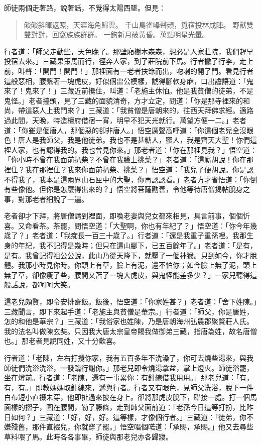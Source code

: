 師徒兩個走著路，說著話，不覺得太陽西墜。但見：
\begin{quote}
燄燄斜暉返照，天涯海角歸雲。
千山鳥雀噪聲頻，覓宿投林成陣。
野獸雙雙對對，回窩族族群群。
一鉤新月破黃昏。萬點明星光暈。
\end{quote}

行者道：「師父走動些，天色晚了。那壁廂樹木森森，想必是人家莊院，我們趕早投宿去來。」三藏果策馬而行，徑奔人家，到了莊院前下馬。行者撇了行李，走上前，叫聲：「開門！開門！」那裡面有一老者扶筇而出，唿喇的開了門。看見行者這般惡相，腰繫著一塊虎皮，好似個雷公模樣，諕得腳軟身麻，口出譫語道：「鬼來了！鬼來了！」三藏近前攙住，叫道：「老施主休怕。他是我貧僧的徒弟，不是鬼怪。」老者擡頭，見了三藏的面貌清奇，方才立定，問道：「你是那寺裡來的和尚，帶這惡人上我門來？」三藏道：「我貧僧是唐朝來的，往西天拜佛求經。適路過此間，天晚，特造檀府借宿一宵，明早不犯天光就行。萬望方便一二。」老者道：「你雖是個唐人，那個惡的卻非唐人。」悟空厲聲高呼道：「你這個老兒全沒眼色！唐人是我師父，我是他徒弟。我也不是甚糖人，蜜人，我是齊天大聖！你們這裡人家，也有認得我的。我也曾見你來。」那老者道：「你在那裡見我？」悟空道：「你小時不曾在我面前扒柴？不曾在我臉上挑菜？」老者道：「這廝胡說！你在那裡住？我在那裡住？我來你面前扒柴、挑菜？」悟空道：「我兒子便胡說。你是認不得我了，我本是這兩界山石匣中的大聖，你再認認看。」老者方才省悟道：「你倒有些像他。但你是怎麼得出來的？」悟空將菩薩勸善，令他等待唐僧揭帖脫身之事，對那老者細說了一遍。

老者卻才下拜，將唐僧請到裡面，即喚老妻與兒女都來相見，具言前事，個個忻喜。又命看茶。茶罷，問悟空道：「大聖啊，你也有年紀了？」悟空道：「你今年幾歲了？」老者道：「我痴長一百三十歲了。」行者道：「還是我重子重孫哩。我那生身的年紀，我不記得是幾時；但只在這山腳下，已五百餘年了。」老者道：「是有，是有。我曾記得祖公公說，此山乃從天降下，就壓了一個神猴。只到如今，你才脫體。我那小時見你時，你頭上有草，臉上有泥，還不怕你；如今臉上無了泥，頭上無了草，卻像瘦了些，腰間又苫了一塊大虎皮，與鬼怪能差多少？」一家兒聽得這般話說，都呵呵大笑。

這老兒頗賢，即令安排齋飯。飯後，悟空道：「你家姓甚？」老者道：「舍下姓陳。」三藏聞言，即下來起手道：「老施主與貧僧是華宗。」行者道：「師父，你是唐姓，怎的和他是華宗？」三藏道：「我俗家也姓陳，乃是唐朝海州弘農郡聚賢莊人氏。我的法名叫做陳玄奘。只因我大唐太宗皇帝賜我做御弟三藏，指唐為姓，故名唐僧也。」那老者見說同姓，又十分歡喜。

行者道：「老陳，左右打攪你家，我有五百多年不洗澡了，你可去燒些湯來，與我師徒們洗浴洗浴，一發臨行謝你。」那老兒即令燒湯拿盆，掌上燈火。師徒浴罷，坐在燈前。行者道：「老陳，還有一事累你：有針線借我用用。」那老兒道：「有，有，有。」即教媽媽取針線來，遞與行者。行者又有眼色，見師父洗浴，脫下一件白布短小直裰未穿，他即扯過來披在身上。卻將那虎皮脫下，聯接一處。打一個馬面樣的摺子，圍在腰間，勒了籐條，走到師父面前道：「老孫今日這等打扮，比昨日如何？」三藏道：「好，好，好。這等樣，才像個行者。」三藏道：「徒弟，你不嫌殘舊，那件直裰兒，你就穿了罷。」悟空唱個喏道：「承賜，承賜。」他又去尋些草料喂了馬。此時各各事畢，師徒與那老兒亦各歸寢。

